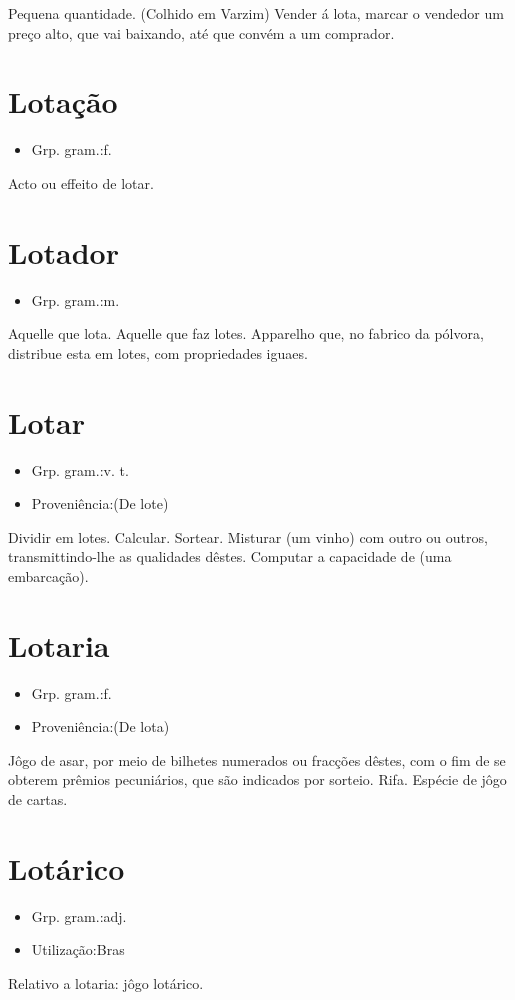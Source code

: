 Pequena quantidade. (Colhido em Varzim)
\textunderscore Vender á lota\textunderscore , marcar o vendedor um preço alto, que vai baixando, até que convém a um comprador.
\section{Lotação}
\begin{itemize}
\item {Grp. gram.:f.}
\end{itemize}
Acto ou effeito de lotar.
\section{Lotador}
\begin{itemize}
\item {Grp. gram.:m.}
\end{itemize}
Aquelle que lota.
Aquelle que faz lotes.
Apparelho que, no fabrico da pólvora, distribue esta em lotes, com propriedades iguaes.
\section{Lotar}
\begin{itemize}
\item {Grp. gram.:v. t.}
\end{itemize}
\begin{itemize}
\item {Proveniência:(De \textunderscore lote\textunderscore )}
\end{itemize}
Dividir em lotes.
Calcular.
Sortear.
Misturar (um vinho) com outro ou outros, transmittindo-lhe as qualidades dêstes.
Computar a capacidade de (uma embarcação).
\section{Lotaria}
\begin{itemize}
\item {Grp. gram.:f.}
\end{itemize}
\begin{itemize}
\item {Proveniência:(De \textunderscore lota\textunderscore )}
\end{itemize}
Jôgo de asar, por meio de bilhetes numerados ou fracções dêstes, com o fim de se obterem prêmios pecuniários, que são indicados por sorteio.
Rifa.
Espécie de jôgo de cartas.
\section{Lotárico}
\begin{itemize}
\item {Grp. gram.:adj.}
\end{itemize}
\begin{itemize}
\item {Utilização:Bras}
\end{itemize}
Relativo a lotaria: \textunderscore jôgo lotárico\textunderscore .
